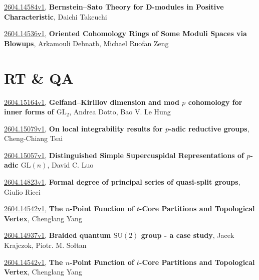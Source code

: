 \documentclass[9pt, a4paper]{article}
\theoremstyle{plain}
\theoremstyle{definition}
\theoremstyle{remark}
\newcommand{\arxiv}[3]{\href{https://arxiv.org/abs/#1}{#1}, \textbf{\textcolor{arxivblue}{#2}}, #3}
\begin{document}
\arxiv{2604.14584v1}{Bernstein--Sato Theory for D-modules in Positive Characteristic}{Daichi Takeuchi}

\arxiv{2604.14536v1}{Oriented Cohomology Rings of Some Moduli Spaces via Blowups}{Arkamouli Debnath, Michael Ruofan Zeng}


\section{RT \& QA}
\arxiv{2604.15164v1}{Gelfand--Kirillov dimension and mod $p$ cohomology for inner forms of $\mathrm{GL}_2$}{Andrea Dotto, Bao V. Le Hung}

\arxiv{2604.15079v1}{On local integrability results for $p$-adic reductive groups}{Cheng-Chiang Tsai}

\arxiv{2604.15057v1}{Distinguished Simple Supercuspidal Representations of $p$-adic $\text{GL}(n)$}{David C. Luo}

\arxiv{2604.14823v1}{Formal degree of principal series of quasi-split groups}{Giulio Ricci}

\arxiv{2604.14542v1}{The $n$-Point Function of $t$-Core Partitions and Topological Vertex}{Chenglang Yang}

\arxiv{2604.14937v1}{Braided quantum $\mathrm{SU}(2)$ group - a case study}{Jacek Krajczok, Piotr. M. Sołtan}

\arxiv{2604.14542v1}{The $n$-Point Function of $t$-Core Partitions and Topological Vertex}{Chenglang Yang}

\end{document}
